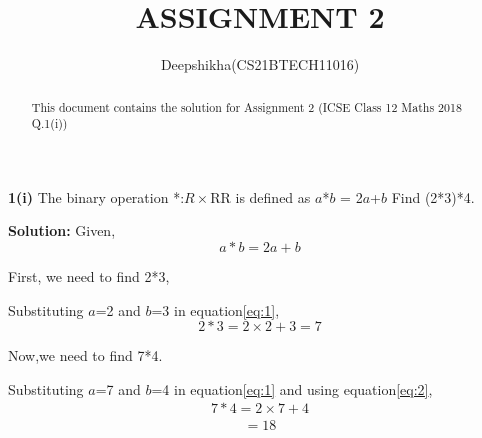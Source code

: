 \documentclass[journal, 12pt, twocolumn]{IEEEtran}
\begin{document}
\title{ASSIGNMENT 2}
\author{Deepshikha(CS21BTECH11016)}
\maketitle

\begin{abstract}
This document contains the solution for Assignment 2 (ICSE Class 12 Maths 2018 Q.1(i))
\end{abstract}

\textbf{1(i)}
The binary operation *:$R\times$R\textrightarrow R is defined as $a$*$b$ = 2$a$+$b$ Find (2*3)*4.


\textbf{Solution:}
Given,
\begin{equation}
     a*b=2a+b\label{eq:1}
\end{equation}

First, we need to find 2*3,


Substituting $a$=2 and $b$=3 in equation\eqref{eq:1},
\begin{equation}
    2*3=2\times2+3=7\label{eq:2}
\end{equation}

Now,we need to find 7*4.


Substituting $a$=7 and $b$=4 in equation\eqref{eq:1} and using equation\eqref{eq:2},
\begin{align*}
    7*4=2\times7+4
\end{align*}
\begin{align*}
      =18
\end{align*}
\end{document}
